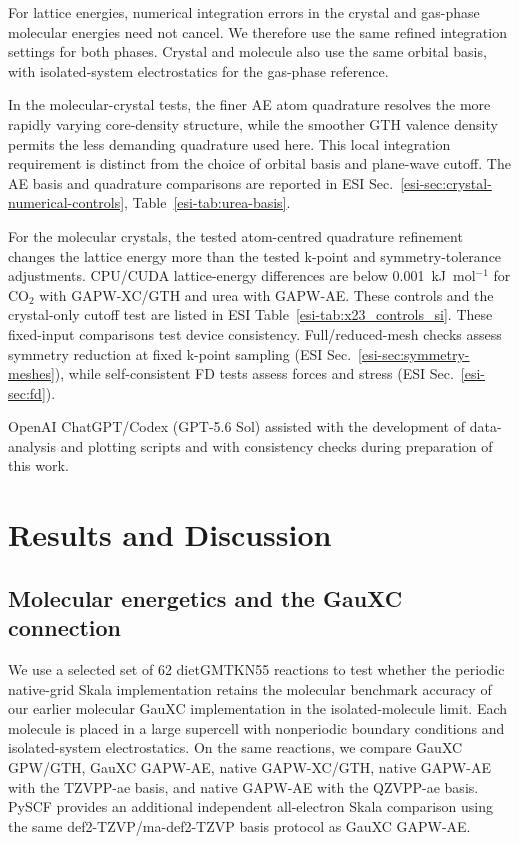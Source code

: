 \documentclass[10pt,a4paper,twocolumn]{article}
\begin{document}
For lattice energies, numerical integration errors in the crystal and gas-phase molecular energies need not cancel. We therefore use the same refined integration settings for both phases. Crystal and molecule also use the same orbital basis, with isolated-system electrostatics for the gas-phase reference.

 In the molecular-crystal tests, the finer AE atom quadrature resolves the more rapidly varying core-density structure, while the smoother GTH valence density permits the less demanding quadrature used here. This local integration requirement is distinct from the choice of orbital basis and plane-wave cutoff.  The AE basis and quadrature comparisons are reported in ESI Sec.~\ref{esi-sec:crystal-numerical-controls}, Table~\ref{esi-tab:urea-basis}.



For the molecular crystals, the tested atom-centred quadrature refinement changes the lattice energy more than the tested k-point and symmetry-tolerance adjustments. CPU/CUDA lattice-energy differences are below 0.001~kJ~mol$^{-1}$ for CO$_2$ with GAPW-XC/GTH and urea with GAPW-AE. These controls and the crystal-only cutoff test are listed in ESI Table~\ref{esi-tab:x23_controls_si}. These fixed-input comparisons test device consistency. Full/reduced-mesh checks assess symmetry reduction at fixed k-point sampling (ESI Sec.~\ref{esi-sec:symmetry-meshes}), while self-consistent FD tests assess forces and stress (ESI Sec.~\ref{esi-sec:fd}).


OpenAI ChatGPT/Codex (GPT-5.6 Sol) assisted with the development of data-analysis and plotting scripts and with consistency checks during preparation of this work.

\section{Results and Discussion}
\label{sec:results}

\subsection{Molecular energetics and the GauXC connection}
\label{sec:molecular-results}

We use a selected set of 62 dietGMTKN55 reactions\cite{Gould2018,Goerigk2017} to test whether the periodic native-grid Skala implementation retains the molecular benchmark accuracy of our earlier molecular GauXC implementation in the isolated-molecule limit.\cite{Poeschel2026MolecularSkala} Each molecule is placed in a large supercell with nonperiodic boundary conditions and isolated-system electrostatics. On the same reactions, we compare GauXC GPW/GTH, GauXC GAPW-AE, native GAPW-XC/GTH, native GAPW-AE with the TZVPP-ae basis, and native GAPW-AE with the QZVPP-ae basis. PySCF provides an additional independent all-electron Skala comparison using the same def2-TZVP/ma-def2-TZVP basis protocol as GauXC GAPW-AE. %
\end{document}

